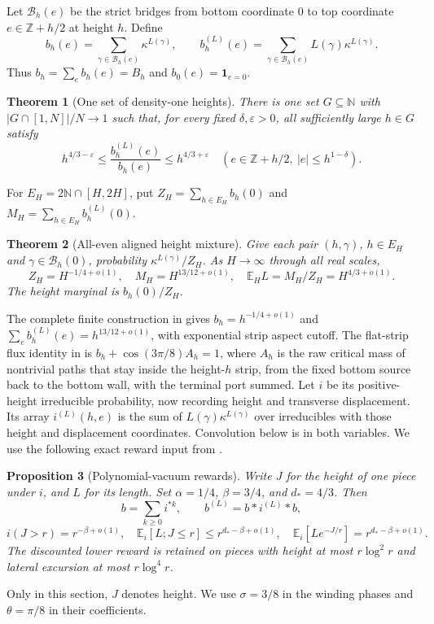 \documentclass[11pt]{article}
\numberwithin{equation}{section}
\newtheorem{theorem}{Theorem}[section]
\newtheorem{proposition}[theorem]{Proposition}
\theoremstyle{definition}\newtheorem{definition}[theorem]{Definition}
\theoremstyle{remark}\newtheorem{remark}[theorem]{Remark}
\begin{document}
Let $\mathcal B_h(e)$ be the strict bridges from bottom coordinate $0$
to top coordinate $e\in\mathbb Z+h/2$ at height $h$. Define
\[
 b_h(e)=\sum_{\gamma\in\mathcal B_h(e)}\kappa^{L(\gamma)},\qquad
 b_h^{(L)}(e)=\sum_{\gamma\in\mathcal B_h(e)}L(\gamma)\kappa^{L(\gamma)}.
\]
Thus $b_h=\sum_e b_h(e)=B_h$ and $b_0(e)=\mathbf1_{e=0}$.
\begin{theorem}[One set of density-one heights]\label{c:density-one}
There is one set $G\subseteq\mathbb N$ with
$|G\cap[1,N]|/N\to1$ such that, for every fixed $\delta,\varepsilon>0$,
all sufficiently large $h\in G$ satisfy
\[
 h^{4/3-\varepsilon}\le\frac{b_h^{(L)}(e)}{b_h(e)}
       \le h^{4/3+\varepsilon}
 \quad(e\in\mathbb Z+h/2,\ |e|\le h^{1-\delta}).
\]
\end{theorem}
For $E_H=2\mathbb N\cap[H,2H]$, put
$Z_H=\sum_{h\in E_H}b_h(0)$ and
$M_H=\sum_{h\in E_H}b_h^{(L)}(0)$.
\begin{theorem}[All-even aligned height mixture]\label{c:mixture}
Give each pair $(h,\gamma)$, $h\in E_H$ and
$\gamma\in\mathcal B_h(0)$, probability $\kappa^{L(\gamma)}/Z_H$.
As $H\to\infty$ through all real scales,
\[
 Z_H=H^{-1/4+o(1)},\quad M_H=H^{13/12+o(1)},\quad
 \mathbb E_H L=M_H/Z_H=H^{4/3+o(1)}.
\]
The height marginal is $b_h(0)/Z_H$.
\end{theorem}

The complete finite construction in \cite[Theorem 1.1 and Lemma 8.2]{PolynomialVacuum} gives
$b_h=h^{-1/4+o(1)}$ and
$\sum_e b_h^{(L)}(e)=h^{13/12+o(1)}$, with exponential strip aspect
cutoff. The flat-strip flux identity in \cite[Section 2]{PolynomialVacuum}
is $b_h+\cos(3\pi/8)A_h=1$, where $A_h$ is the raw critical
mass of nontrivial paths that stay inside the height-$h$ strip,
from the fixed bottom source back to the bottom wall,
with the terminal port summed. Let $i$ be its positive-height irreducible
probability, now recording height and transverse displacement. Its array
$i^{(L)}(h,e)$ is the sum of $L(\gamma)\kappa^{L(\gamma)}$ over
irreducibles with those height and displacement coordinates. Convolution
below is in both variables. We use the following exact reward input from
\cite[Proposition 10.1]{Renewal}.

\begin{proposition}[Polynomial-vacuum rewards]\label{c:pv-rewards}
Write $J$ for the height of one piece under $i$, and $L$ for its length.
Set $\alpha=1/4$, $\beta=3/4$, and $d_*=4/3$. Then
\[
 b=\sum_{k\ge0}i^{*k},\qquad b^{(L)}=b*i^{(L)}*b,
\]
\[
 i(J>r)=r^{-\beta+o(1)},\quad
 \mathbb E_i[L;J\le r]\le r^{d_*-\beta+o(1)},\quad
 \mathbb E_i[Le^{-J/r}]=r^{d_*-\beta+o(1)}.
\]
The discounted lower reward is retained on pieces with height at most
$r\log^2r$ and lateral excursion at most $r\log^4r$.
\end{proposition}
Only in this section, $J$ denotes height. We use $\sigma=3/8$ in the winding phases and
$\theta=\pi/8$ in their coefficients.
\end{document}
